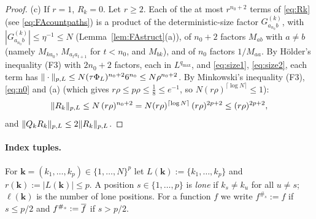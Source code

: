 \begin{proof}
(c) If $r=1$, $R_k=0$. Let $r\ge2$. Each of the at most $r^{n_0+2}$ terms of \eqref{eq:Rk} (see \eqref{eq:FAcountpaths}) is a product of the deterministic-size factor $G^{(k)}_{a_{n_0}b}$, with $|G^{(k)}_{a_{n_0}b}|\le\eta^{-1}\le N$ (Lemma~\ref{lem:FAstruct}(a)), of $n_0+2$ factors $M_{ab}$ with $a\ne b$
(namely $M_{ka_0}$, $M_{a_ta_{t+1}}$ for $t<n_0$, and $M_{bk}$), and of $n_0$ factors $1/M_{aa}$. By H\"older's inequality (F3) with $2n_0+2$ factors, each in $L^{q_{\max}}$, and \eqref{eq:size1}, \eqref{eq:size2}, each term has $\|\cdot\|_{p,L}\le N(\tau\Phi_L)^{n_0+2}6^{n_0}\le N\rho^{n_0+2}$.
By Minkowski's inequality (F3), \eqref{eq:n0} and (a) (which gives $r\rho\le p\rho\le\frac18\le e^{-1}$, so $N(r\rho)^{\lceil\log N\rceil}\le1$):
\[
 \|R_k\|_{p,L}\le N\,(r\rho)^{n_0+2}=N(r\rho)^{\lceil\log N\rceil}\,(r\rho)^{2p+2}\le(r\rho)^{2p+2},
\]
and $\|Q_kR_k\|_{p,L}\le2\|R_k\|_{p,L}$.
\end{proof}

\paragraph{Index tuples.} For $\mathbf k=(k_1,\dots,k_p)\in\{1,\dots,N\}^p$ let $L(\mathbf k):=\{k_1,\dots,k_p\}$ and $r(\mathbf k):=|L(\mathbf k)|\le p$. A position $s\in\{1,\dots,p\}$ is \emph{lone} if $k_s\ne k_{u}$ for all $u\ne s$; $\ell(\mathbf k)$ is the number of lone positions.
For a function $f$ we write $f^{\#_s}:=f$ if $s\le p/2$ and $f^{\#_s}:=\overline{f}$ if $s>p/2$.

